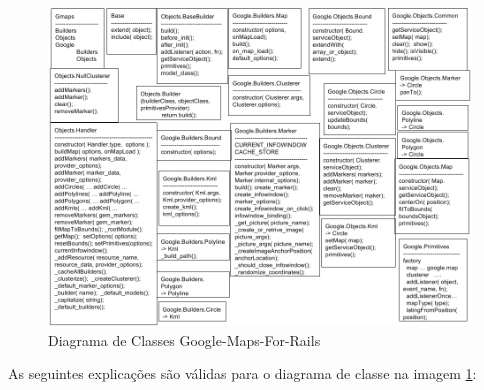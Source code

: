 \begin{figure}[ht]
  \begin{center}     
    \includegraphics[scale=0.35]{images/diagrama_de_classes_google_maps_for_rails.png}
    \caption{Diagrama de Classes Google-Maps-For-Rails}
    \label{fig:diagrama_de_classes_google_maps_for_rails}
  \end{center}
\end{figure}

As seguintes explicações são válidas para o diagrama de classe na imagem
\ref{fig:diagrama_de_classes_google_maps_for_rails}:

